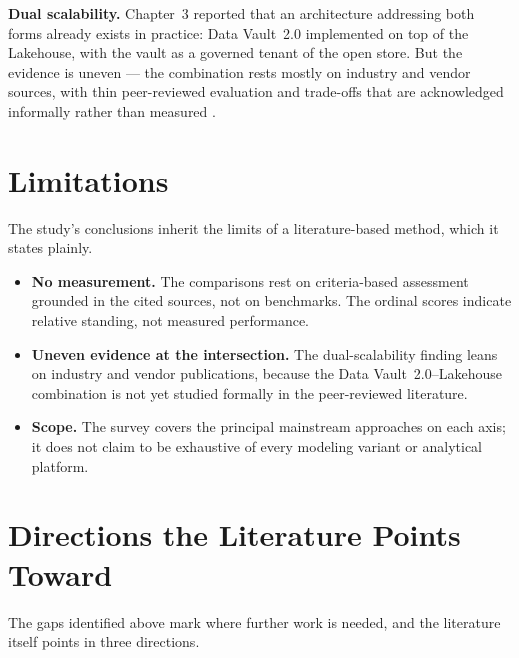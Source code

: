 \noindent\textbf{Dual scalability.} Chapter~3 reported that an architecture addressing both forms already exists in practice: Data Vault~2.0 implemented on top of the Lakehouse, with the vault as a governed tenant of the open store. But the evidence is uneven --- the combination rests mostly on industry and vendor sources, with thin peer-reviewed evaluation and trade-offs that are acknowledged informally rather than measured \parencite{databricks2022, giebler2019dv, schneider2024}.

\section*{Limitations}

The study's conclusions inherit the limits of a literature-based method, which it states plainly.

\begin{itemize}[noitemsep, topsep=4pt]
  \item \textbf{No measurement.} The comparisons rest on criteria-based assessment grounded in the cited sources, not on benchmarks. The ordinal scores indicate relative standing, not measured performance.
  \item \textbf{Uneven evidence at the intersection.} The dual-scalability finding leans on industry and vendor publications, because the Data Vault~2.0--Lakehouse combination is not yet studied formally in the peer-reviewed literature.
  \item \textbf{Scope.} The survey covers the principal mainstream approaches on each axis; it does not claim to be exhaustive of every modeling variant or analytical platform.
\end{itemize}

\section*{Directions the Literature Points Toward}

The gaps identified above mark where further work is needed, and the literature itself points in three directions.

